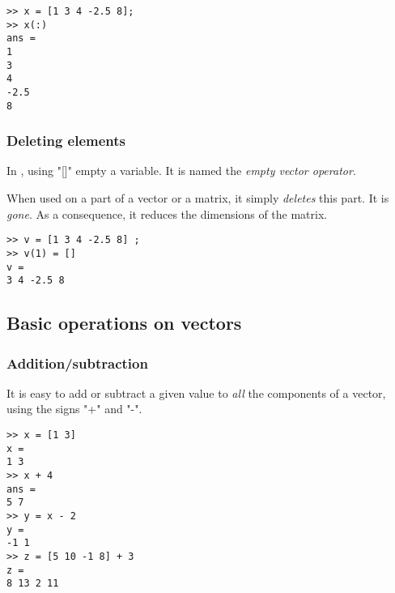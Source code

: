 \begin{lstlisting}
>> x = [1 3 4 -2.5 8];
>> x(:)
ans = 
1
3
4
-2.5
8
\end{lstlisting}




\subsubsection{Deleting elements}




In \matlab, using "[]" empty a variable. It is named the \emph{empty vector operator}.
	
When used on a part of a vector or a matrix, it simply \emph{deletes} this part.
It is \emph{gone}.
As a consequence, it reduces the dimensions of the matrix.


\begin{lstlisting}
>> v = [1 3 4 -2.5 8] ;
>> v(1) = []
v = 
3 4 -2.5 8
\end{lstlisting}




\subsection{Basic operations on vectors}
\subsubsection{Addition/subtraction}
It is easy to add or subtract a given value to \emph{all} the components of a vector, using the signs "+" and "-".

\begin{lstlisting}
>> x = [1 3]
x = 
1 3
>> x + 4
ans =
5 7
>> y = x - 2
y =
-1 1
>> z = [5 10 -1 8] + 3
z = 
8 13 2 11
\end{lstlisting}


